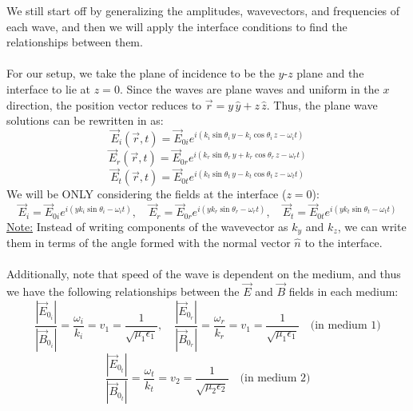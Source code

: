 \documentclass[12pt]{article}
\begin{document}
We still start off by generalizing the amplitudes, wavevectors, and frequencies of each wave, and then we will apply the interface conditions to find the relationships between them.\\\\
For our setup, we take the plane of incidence to be the $y\text{-}z$ plane and the interface to lie at $z = 0$. Since the waves are plane waves and uniform in the $x$ direction, the position vector reduces to $\vec{r} = y\,\hat{y} + z\,\hat{z}$. Thus, the plane wave solutions can be rewritten in as:
\[\vec{E}_i(\vec{r},t) = \vec{E}_{0i} e^{i(k_i \sin\theta_i \, y - k_i \cos\theta_i \, z - \omega_i t)}
\]
\[\vec{E}_r(\vec{r},t) = \vec{E}_{0r} e^{i(k_r \sin\theta_r \, y + k_r \cos\theta_r \, z - \omega_r t)}
\]
\[\vec{E}_t(\vec{r},t) = \vec{E}_{0t} e^{i(k_t \sin\theta_t \, y - k_t \cos\theta_t \, z - \omega_t t)}
\]
We will be ONLY considering the fields at the interface ($z = 0$):
\[\vec{E}_i = \vec{E}_{0i} e^{i(y k_i \sin\theta_i - \omega_i t)}, \quad \vec{E}_r = \vec{E}_{0r} e^{i(y k_r \sin\theta_r - \omega_r t)}, \quad \vec{E}_t = \vec{E}_{0t} e^{i(y k_t \sin\theta_t - \omega_t t)}\]
\underline{Note:} Instead of writing components of the wavevector as $k_y$ and $k_z$, we can write them in terms of the angle formed with the normal vector $\hat{n}$ to the interface.\\\\
Additionally, note that speed of the wave is dependent on the medium, and thus we have the following relationships between the $\vec{E}$ and $\vec{B}$ fields in each medium:
\[ \frac{|\vec{E}_{0_i}|}{|\vec{B}_{0_i}|} = \frac{\omega_i}{k_i} = v_1 = \frac{1}{\sqrt{\mu_1 \epsilon_1}}, \quad \frac{|\vec{E}_{0_r}|}{|\vec{B}_{0_r}|} = \frac{\omega_r}{k_r} = v_1 = \frac{1}{\sqrt{\mu_1 \epsilon_1}}\quad \text{(in medium 1)} \]
\[ \frac{|\vec{E}_{0_t}|}{|\vec{B}_{0_t}|} = \frac{\omega_t}{k_t} = v_2 = \frac{1}{\sqrt{\mu_2 \epsilon_2}} \quad \text{(in medium 2)}\]
\newpage
\end{document}
